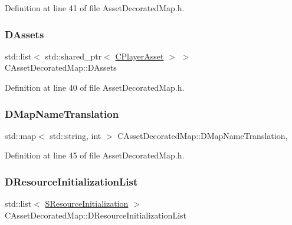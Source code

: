Definition at line 41 of file Asset\+Decorated\+Map.\+h.

\hypertarget{classCAssetDecoratedMap_a94eeed5b16141169b1ba6cb3842055aa}{}\label{classCAssetDecoratedMap_a94eeed5b16141169b1ba6cb3842055aa} 
\subsubsection{\texorpdfstring{D\+Assets}{DAssets}}
{\footnotesize\ttfamily std\+::list$<$ std\+::shared\+\_\+ptr$<$ \hyperlink{classCPlayerAsset}{C\+Player\+Asset} $>$ $>$ C\+Asset\+Decorated\+Map\+::\+D\+Assets\hspace{0.3cm}{\ttfamily [protected]}}



Definition at line 40 of file Asset\+Decorated\+Map.\+h.

\hypertarget{classCAssetDecoratedMap_afe82d461911e52b7e088da903166f1b3}{}\label{classCAssetDecoratedMap_afe82d461911e52b7e088da903166f1b3} 
\subsubsection{\texorpdfstring{D\+Map\+Name\+Translation}{DMapNameTranslation}}
{\footnotesize\ttfamily std\+::map$<$ std\+::string, int $>$ C\+Asset\+Decorated\+Map\+::\+D\+Map\+Name\+Translation\hspace{0.3cm}{\ttfamily [static]}, {\ttfamily [protected]}}



Definition at line 45 of file Asset\+Decorated\+Map.\+h.

\hypertarget{classCAssetDecoratedMap_ab4c78aeb90280ea98a3aa542cdb7f8cc}{}\label{classCAssetDecoratedMap_ab4c78aeb90280ea98a3aa542cdb7f8cc} 
\subsubsection{\texorpdfstring{D\+Resource\+Initialization\+List}{DResourceInitializationList}}
{\footnotesize\ttfamily std\+::list$<$ \hyperlink{structCAssetDecoratedMap_1_1SResourceInitialization}{S\+Resource\+Initialization} $>$ C\+Asset\+Decorated\+Map\+::\+D\+Resource\+Initialization\+List\hspace{0.3cm}{\ttfamily [protected]}}



